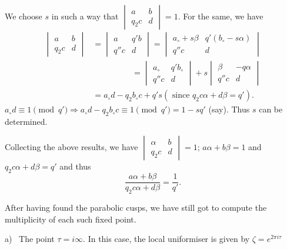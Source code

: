 We choose $s$ in such a way that $\begin{vmatrix} a & b \\ q_2c &
  d \end{vmatrix} = 1$. For the same, we have 
\begin{align*}
  \begin{vmatrix} a & b \\ q_2c & d \end{vmatrix}  & = \begin{vmatrix}
    a & q'b \\ q''c & d \end{vmatrix} = \begin{vmatrix} a_\circ + s
    \beta & q'(b_\circ - s \alpha) \\ q''c & d \end{vmatrix}\\
  & \hspace{2cm} =\begin{vmatrix} a_\circ & q'b_\circ \\ q''c & d \end{vmatrix} +
  s \begin{vmatrix} \beta & -q\alpha \\ q''c &
    d \end{vmatrix}\\ 
  &  = a_\circ d - q_2 b_\circ c + q's (\text{ since } q_2 c \alpha +
  d \beta =q'). 
\end{align*}
$a_\circ d \equiv 1 \pmod {q'} \Rightarrow a_\circ d - q_2 b_\circ c
\equiv 1 \pmod {q'} =1- sq'$ (say). Thus $s$ can be determined. 

Collecting the above results, we have $\begin{vmatrix} \alpha & b
  \\ q_2c & d \end{vmatrix} =1$; $a \alpha + b \beta =1$ and $q_2 c
\alpha + d \beta = q'$ and thus 
$$
\frac{a \alpha + b \beta}{q_2 c \alpha + d \beta} = \frac{1}{q'}.
$$

After having found the parabolic cusps, we have still got to compute
the multiplicity of each such fixed point. 

a)~ The point $\tau =i \infty$. In this case, the local uniformiser
is given by $\zeta = e^{2 \pi i \tau}$ 

